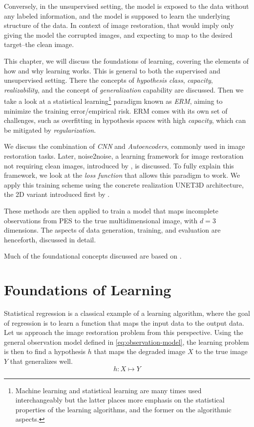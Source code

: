 Conversely, in the unsupervised setting, the model is exposed to the data without any labeled information, and the model is supposed to learn the underlying structure of the data. In context of image restoration, that would imply only giving the model the corrupted images, and expecting to map to the desired target--the clean image.

This chapter, we will discuss the foundations of learning, covering the elements of how and why learning works. This is general to both the supervised and unsupervised setting. There the concepts of \textit{hypothesis class}, \textit{capacity}, \textit{realizability}, and the concept of \textit{generalization} capability are discussed. Then we take a look at a statistical learning\footnote{Machine learning and statistical learning are many times used interchangeably but the latter places more emphasis on the statistical properties of the learning algorithms, and the former on the algorithmic aspects.} paradigm known as \textit{\gls{ERM}}, aiming to minimize the training error/empirical risk. \Gls{ERM} comes with its own set of challenges, such as overfitting in hypothesis spaces with high \textit{capacity}, which can be mitigated by \textit{regularization}. 

We discuss the combination of \textit{\gls{CNN}} and \textit{Autoencoders}, commonly used in image restoration tasks. Later, \gls{noise2noise}, a learning framework for image restoration not requiring clean images, introduced by \citeauthor{lehtinenNoise2NoiseLearningImage2018}, is discussed. To fully explain this framework, we look at the \textit{loss function} that allows this paradigm to work. We apply this training scheme using the concrete realization UNET3D architecture, the 2D variant introduced first by \citeauthor{ronnebergerUNetConvolutionalNetworks}.

These methods are then applied to train a model that maps incomplete observations from \gls{PES} to the true multidimensional image, with $d=3$ dimensions. The aspects of data generation, training, and evaluation are henceforth, discussed in detail.

Much of the foundational concepts discussed are based on \cite{shalev-shwartzUnderstandingMachineLearning2014a,jamesIntroductionStatisticalLearning2013,tibshiraniElementsStatisticalLearning,goodfellowDeepLearning2016}.

\section{Foundations of Learning}
Statistical regression is a classical example of a learning algorithm, where the goal of regression is to learn a function that maps the input data to the output data.
Let us approach the image restoration problem from this perspective. Using the general observation model defined in \cref{eq:observation-model}, the learning problem is then to find a hypothesis $h$ that maps the degraded image $X$ to the true image $Y$ that generalizes well.
\begin{equation}
    h: X \mapsto Y
\end{equation}

